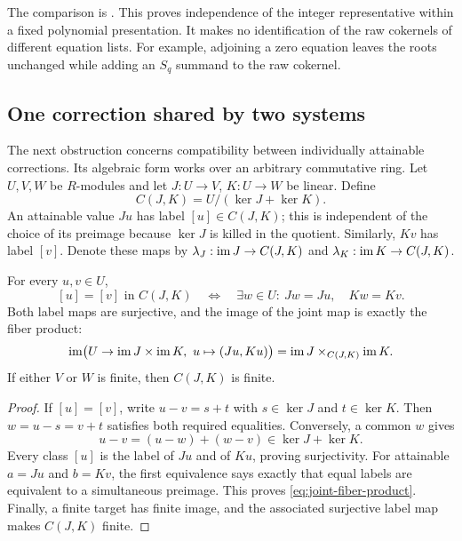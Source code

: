 The comparison is
.
This proves independence of the integer representative within a fixed
polynomial presentation. It makes no identification of the raw cokernels
of different equation lists. For example, adjoining a zero equation leaves
the roots unchanged while adding an $S_q$ summand to the raw cokernel.

\subsection{One correction shared by two systems}

The next obstruction concerns compatibility between individually attainable
corrections. Its algebraic form works over an arbitrary commutative ring.
Let $U,V,W$ be $R$-modules and let $J:U\to V$, $K:U\to W$ be linear.
Define
\begin{equation}\label{eq:common-quotient}
 C(J,K)=U/(\ker J+\ker K).
\end{equation}
An attainable value $Ju$ has label $[u]\in C(J,K)$; this is independent of
the choice of its preimage because $\ker J$ is killed in the quotient.
Similarly, $Kv$ has label $[v]$. Denote these maps by
$\lambda_J:\operatorname{im} J\to C(J,K)$ and $\lambda_K:\operatorname{im} K\to C(J,K)$.

\begin{theorem}\label{thm:common-correction}
For every $u,v\in U$,
\begin{equation}\label{eq:common-correction}
 [u]=[v]\text{ in }C(J,K)
 \quad\Longleftrightarrow\quad
 \exists w\in U:\ Jw=Ju,\quad Kw=Kv.
\end{equation}
Both label maps are surjective, and the image of the joint map is exactly
the fiber product:
\begin{equation}\label{eq:joint-fiber-product}
 \operatorname{im}\bigl(U\to\operatorname{im} J\times\operatorname{im} K,\ u\mapsto(Ju,Ku)\bigr)
 =\operatorname{im} J\mathbin{\times}_{C(J,K)}\operatorname{im} K.
\end{equation}
If either $V$ or $W$ is finite, then $C(J,K)$ is finite.
\end{theorem}

\begin{proof}
If $[u]=[v]$, write $u-v=s+t$ with $s\in\ker J$ and $t\in\ker K$.
Then $w=u-s=v+t$ satisfies both required equalities. Conversely, a common
$w$ gives
\[
 u-v=(u-w)+(w-v)\in\ker J+\ker K.
\]
Every class $[u]$ is the label of $Ju$ and of $Ku$, proving surjectivity.
For attainable $a=Ju$ and $b=Kv$, the first equivalence says exactly that
equal labels are equivalent to a simultaneous preimage. This proves
\eqref{eq:joint-fiber-product}. Finally, a finite target has finite image,
and the associated surjective label map makes $C(J,K)$ finite.
\end{proof}

